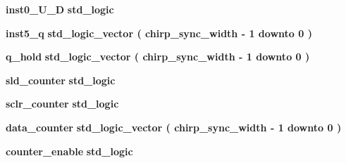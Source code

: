\begin{DoxyCompactItemize}
\item 
{\bf inst0\+\_\+\+U\+\_\+D} {\bfseries \textcolor{comment}{std\+\_\+logic}\textcolor{vhdlchar}{ }} 
\item 
{\bf inst5\+\_\+q} {\bfseries \textcolor{comment}{std\+\_\+logic\+\_\+vector}\textcolor{vhdlchar}{ }\textcolor{vhdlchar}{(}\textcolor{vhdlchar}{ }\textcolor{vhdlchar}{ }\textcolor{vhdlchar}{ }\textcolor{vhdlchar}{ }{\bfseries {\bf chirp\+\_\+sync\+\_\+width}} \textcolor{vhdlchar}{-\/}\textcolor{vhdlchar}{ } \textcolor{vhdldigit}{1} \textcolor{vhdlchar}{ }\textcolor{keywordflow}{downto}\textcolor{vhdlchar}{ }\textcolor{vhdlchar}{ } \textcolor{vhdldigit}{0} \textcolor{vhdlchar}{ }\textcolor{vhdlchar}{)}\textcolor{vhdlchar}{ }} 
\item 
{\bf q\+\_\+hold} {\bfseries \textcolor{comment}{std\+\_\+logic\+\_\+vector}\textcolor{vhdlchar}{ }\textcolor{vhdlchar}{(}\textcolor{vhdlchar}{ }\textcolor{vhdlchar}{ }\textcolor{vhdlchar}{ }\textcolor{vhdlchar}{ }{\bfseries {\bf chirp\+\_\+sync\+\_\+width}} \textcolor{vhdlchar}{-\/}\textcolor{vhdlchar}{ } \textcolor{vhdldigit}{1} \textcolor{vhdlchar}{ }\textcolor{keywordflow}{downto}\textcolor{vhdlchar}{ }\textcolor{vhdlchar}{ } \textcolor{vhdldigit}{0} \textcolor{vhdlchar}{ }\textcolor{vhdlchar}{)}\textcolor{vhdlchar}{ }} 
\item 
{\bf sld\+\_\+counter} {\bfseries \textcolor{comment}{std\+\_\+logic}\textcolor{vhdlchar}{ }} 
\item 
{\bf sclr\+\_\+counter} {\bfseries \textcolor{comment}{std\+\_\+logic}\textcolor{vhdlchar}{ }} 
\item 
{\bf data\+\_\+counter} {\bfseries \textcolor{comment}{std\+\_\+logic\+\_\+vector}\textcolor{vhdlchar}{ }\textcolor{vhdlchar}{(}\textcolor{vhdlchar}{ }\textcolor{vhdlchar}{ }\textcolor{vhdlchar}{ }\textcolor{vhdlchar}{ }{\bfseries {\bf chirp\+\_\+sync\+\_\+width}} \textcolor{vhdlchar}{-\/}\textcolor{vhdlchar}{ } \textcolor{vhdldigit}{1} \textcolor{vhdlchar}{ }\textcolor{keywordflow}{downto}\textcolor{vhdlchar}{ }\textcolor{vhdlchar}{ } \textcolor{vhdldigit}{0} \textcolor{vhdlchar}{ }\textcolor{vhdlchar}{)}\textcolor{vhdlchar}{ }} 
\item 
{\bf counter\+\_\+enable} {\bfseries \textcolor{comment}{std\+\_\+logic}\textcolor{vhdlchar}{ }} 
\end{DoxyCompactItemize}
